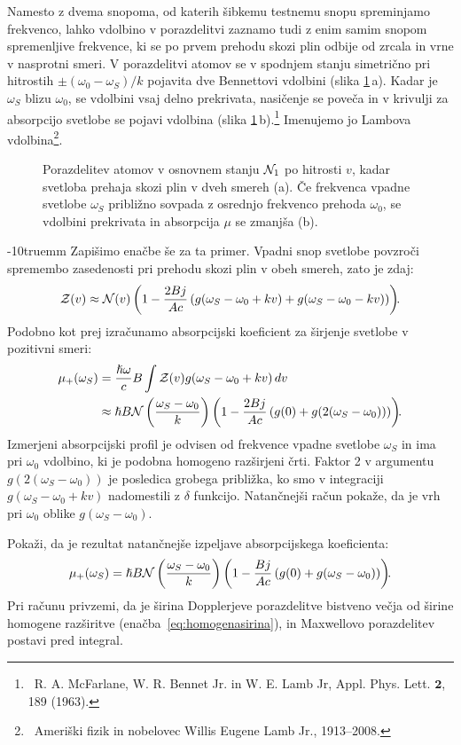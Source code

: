 Namesto z dvema snopoma, od katerih šibkemu testnemu snopu spreminjamo
frekvenco, lahko vdolbino v porazdelitvi zaznamo tudi z enim samim snopom
spremenljive frekvence, ki se po prvem prehodu skozi plin odbije od
zrcala in vrne v nasprotni smeri. V porazdelitvi atomov se
v spodnjem stanju simetrično pri hitrostih $\pm(\omega_{0}-\omega_S)/k$
pojavita dve Bennettovi vdolbini (slika \ref{fig:Lamb}\,a).
Kadar je $\omega_S$ blizu $\omega_{0}$, se vdolbini vsaj delno prekrivata, 
nasičenje se poveča in v krivulji za absorpcijo svetlobe se pojavi 
vdolbina (slika \ref{fig:Lamb}\,b).\footnote{~R. A. McFarlane,
W. R. Bennet Jr. in W. E. Lamb Jr, Appl. Phys. Lett. $\mathbf{2}$, 189 (1963).}
Imenujemo jo Lambova vdolbina\footnote{~Ameriški fizik in nobelovec 
Willis Eugene Lamb Jr., 1913--2008.}.
\begin{figure}[ht]
\centering
\def\svgwidth{120truemm} 

\caption{Porazdelitev atomov v osnovnem stanju ${\cal N}_1$ po hitrosti $v$, kadar svetloba prehaja 
skozi plin v dveh smereh (a). Če frekvenca vpadne svetlobe $\omega_S$ približno 
sovpada z osrednjo frekvenco prehoda $\omega_0$, se vdolbini prekrivata in absorpcija $\mu$ 
se zmanjša (b).}
\label{fig:Lamb}
\end{figure}
\vglue-10truemm
Zapišimo enačbe še za ta primer. Vpadni snop svetlobe povzroči spremembo zasedenosti
pri prehodu skozi plin v obeh smereh, zato je zdaj:
\begin{equation}
{\cal Z}(v)\approx{\cal N}(v)\left(1-\frac{2Bj}{Ac}\left(g(\omega_S-\omega_{0}+kv)+
g(\omega_S-\omega_{0}-kv)\right)\right)\!\!.
\label{4.92}
\end{equation}
Podobno kot prej izračunamo absorpcijski koeficient za širjenje svetlobe v
pozitivni smeri: 
\begin{align}
\mu_{+}(\omega_S) & =  \frac{\hslash\omega}{c}B\int{\cal Z}(v)g(\omega_S-\omega_{0}+kv)\, dv\nonumber \\
 & \approx  \hslash B{\cal N}\left(\frac{\omega_S-\omega_0}{k}\right)\left(1-\frac{2Bj}
 {Ac}\left(g(0)+g(2(\omega_S-\omega_{0}))\right)\right)\!\!.
 \label{eq:lamb}
\end{align}
Izmerjeni absorpcijski profil je odvisen od frekvence vpadne svetlobe $\omega_S$ in ima pri $\omega_0$ vdolbino,
ki je podobna homogeno razširjeni črti. Faktor 2 v argumentu
 $g(2(\omega_S-\omega_{0}))$ je posledica  grobega približka,
ko smo v integraciji $g(\omega_S-\omega_{0}+kv)$ nadomestili z $\delta$ funkcijo. 
Natančnejši račun pokaže, da je vrh pri $\omega_{0}$ oblike $g(\omega_S-\omega_{0})$.
\begin{naloga}
Pokaži, da je rezultat natančnejše izpeljave absorpcijskega koeficienta:
\begin{equation}
 \mu_{+}(\omega_S) = \hslash B{\cal N}\left(\frac{\omega_S-\omega_0}{k}\right)\left(1-\frac{Bj}
 {Ac}\left(g(0)+g(\omega_S-\omega_{0})\right)\right)\!\!.
\end{equation}
Pri računu privzemi, da je širina Dopplerjeve porazdelitve bistveno večja od širine homogene
razširitve (enačba~\ref{eq:homogenasirina}), in Maxwellovo porazdelitev postavi pred integral. 
\end{naloga}


